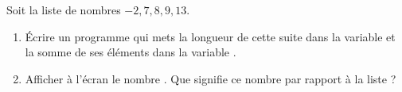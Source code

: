 
\begin{exercice}\label{exoPremiere-0035}

    Soit la liste de nombres \( -2,7,8,9,13\).
    \begin{enumerate}
        \item
            Écrire un programme qui mets la longueur de cette suite dans la variable  et la somme de ses éléments dans la variable .
        \item
            Afficher à l'écran le nombre . Que signifie ce nombre par rapport à la liste ?
    \end{enumerate}

\end{exercice}

